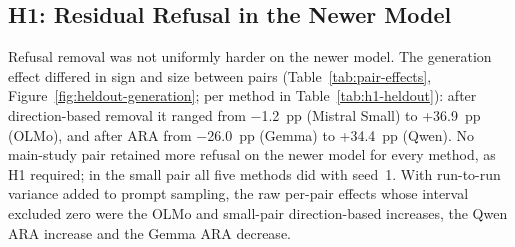 \subsection{H1: Residual Refusal in the Newer Model}
\label{sec:res-h1}

Refusal removal was not uniformly harder on the newer model. The generation
effect differed in sign and size between pairs (Table~\ref{tab:pair-effects},
Figure~\ref{fig:heldout-generation}; per method in
Table~\ref{tab:h1-heldout}): after direction-based removal it ranged from
$-$1.2~pp (Mistral Small) to +36.9~pp (OLMo), and after ARA from $-$26.0~pp
(Gemma) to +34.4~pp (Qwen). No main-study pair retained more refusal on the
newer model for every method, as H1 required; in the small pair all five
methods did with seed~1. With run-to-run variance added to prompt sampling, the
raw per-pair effects whose interval excluded zero were the OLMo and small-pair
direction-based increases, the Qwen ARA increase and the Gemma ARA decrease.

